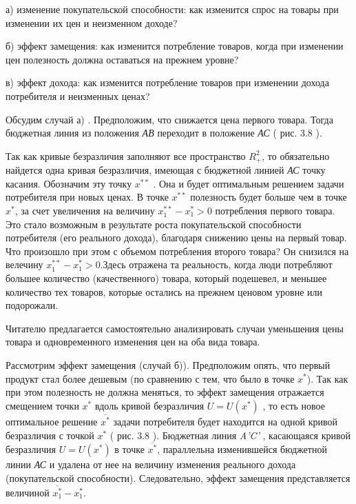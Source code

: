 \documentclass[12pt, 4paper]{book}
\begin{document}
{а) изменение покупательской способности: как изменится спрос на товары при изменении их цен и неизменном доходе? 
\par

б) эффект замещения: как изменится потребление товаров, когда при изменении цен полезность должна оставаться на прежнем уровне? 
\par

в) эффект дохода: как изменится потребление товаров при изменении дохода потребителя и неизменных ценах?
\par

Обсудим случай а) . Предположим, что снижается цена первого товара. Тогда бюджетная линия из положения \textit{АВ} переходит в положение \textit{АС} ( рис. 3.8 ). 
\par

Так как кривые безразличия заполняют все пространство $R_{+}^{2}$, то обязательно найдется одна кривая безразличия, имеющая с бюджетной линией \textit{АС} точку касания. Обозначим эту точку $x^{**}$ . Она и будет оптимальным решением задачи потребителя при новых ценах. В точке $x^{**}$  полезность будет больше чем в точке $x^{*}$, за счет увеличения на величину $x_{1}^{**}-x_{1}^{*} > 0$  потребления первого товара. Это стало возможным в результате роста покупательской способности потребителя (его реального дохода), благодаря снижению цены на первый товар. Что произошло при этом с объемом потребления второго товара? Он снизился на велечину $x_{1}^{**}-x_{1}^{*} > 0$.Здесь отражена та реальность, когда люди потребляют большее количество (качественного) товара, который подешевел, и меньшее количество тех товаров, которые остались на прежнем ценовом уровне или подорожали.
\par

Читателю предлагается самостоятельно анализировать случаи уменьшения цены товара и одновременного изменения цен на оба вида товара. 
\par

Рассмотрим эффект замещения (случай б)). Предположим опять, что первый продукт стал более дешевым (по сравнению с тем, что было в точке $x^{*}$). Так как при этом полезность не должна меняться, то эффект замещения отражается смещением точки $x^{*}$ вдоль кривой безразличия $U=U(x^{*})$ , то есть новое оптимальное решение $\overline{x^{*}}$ задачи потребителя будет находится на одной кривой безразличия с точкой $x^{*}$ ( рис. 3.8 ). Бюджетная линия \textit{A'C'} , касающаяся кривой безразличия $U=U(x^{*})$ в точке $\overline{x^{*}}$, параллельна изменившейся бюджетной линии \textit{АС} и удалена от нее на величину изменения реального дохода (покупательской способности). Следовательно, эффект замещения представляется величиной $\overline{x_{1}^{*}} - x_{1}^{*}$.
\par

}
\end{document}
